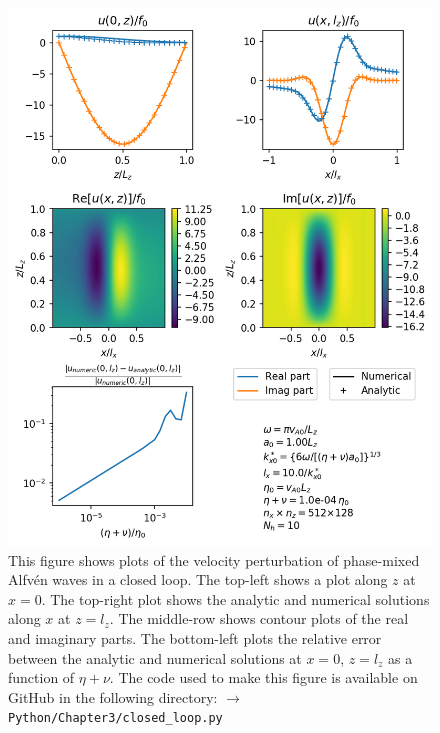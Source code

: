 \begin{figure}
    \centering
    \vspace{-20pt}
    \includegraphics[width=\textwidth,height=0.85\textheight,keepaspectratio]{figures/chapter03/phase_mixing_closed_loop.png}
    \vspace{-10pt}
    \caption{This figure shows plots of the velocity perturbation of phase-mixed Alfv\'en waves in a closed loop. The top-left shows a plot along $z$ at $x=0$. The top-right plot shows the analytic and numerical solutions along $x$ at $z=l_z$. The middle-row shows contour plots of the real and imaginary parts. The bottom-left plots the relative error between the analytic and numerical solutions at $x=0$, $z=l_z$ as a function of $\eta+\nu$. The code used to make this figure is available on GitHub in the following directory:\newline
    \texttt{$\rightarrow$ Python/Chapter3/closed\_loop.py}}
    \label{fig:phase_mixing_closed_loop}
    \vspace{-30pt}
\end{figure}
 
